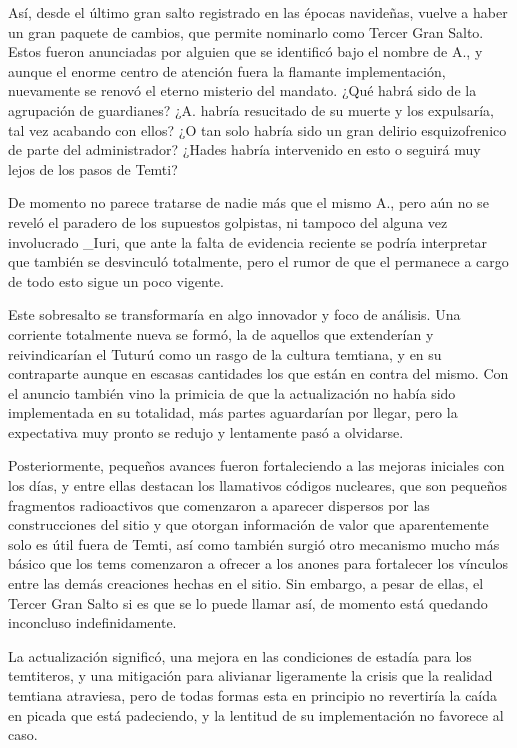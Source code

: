 \documentclass[
]{book}
\begin{document}
Así, desde el último gran salto registrado en las épocas navideñas, vuelve a haber un gran paquete de cambios, que permite nominarlo como Tercer Gran Salto. Estos fueron anunciadas por alguien que se identificó bajo el nombre de A., y aunque el enorme centro de atención fuera la flamante implementación, nuevamente se renovó el eterno misterio del mandato. ¿Qué habrá sido de la agrupación de guardianes? ¿A. habría resucitado de su muerte y los expulsaría, tal vez acabando con ellos? ¿O tan solo habría sido un gran delirio esquizofrenico de parte del administrador? ¿Hades habría intervenido en esto o seguirá muy lejos de los pasos de Temti?

De momento no parece tratarse de nadie más que el mismo A., pero aún no se reveló el paradero de los supuestos golpistas, ni tampoco del alguna vez involucrado \_Iuri, que ante la falta de evidencia reciente se podría interpretar que también se desvinculó totalmente, pero el rumor de que el permanece a cargo de todo esto sigue un poco vigente.

Este sobresalto se transformaría en algo innovador y foco de análisis. Una corriente totalmente nueva se formó, la de aquellos que extenderían y reivindicarían el Tuturú como un rasgo de la cultura temtiana, y en su contraparte aunque en escasas cantidades los que están en contra del mismo. Con el anuncio también vino la primicia de que la actualización no había sido implementada en su totalidad, más partes aguardarían por llegar, pero la expectativa muy pronto se redujo y lentamente pasó a olvidarse.

Posteriormente, pequeños avances fueron fortaleciendo a las mejoras iniciales con los días, y entre ellas destacan los llamativos códigos nucleares, que son pequeños fragmentos radioactivos que comenzaron a aparecer dispersos por las construcciones del sitio y que otorgan información de valor que aparentemente solo es útil fuera de Temti, así como también surgió otro mecanismo mucho más básico que los tems comenzaron a ofrecer a los anones para fortalecer los vínculos entre las demás creaciones hechas en el sitio. Sin embargo, a pesar de ellas, el Tercer Gran Salto si es que se lo puede llamar así, de momento está quedando inconcluso indefinidamente.

La actualización significó, una mejora en las condiciones de estadía para los temtiteros, y una mitigación para alivianar ligeramente la crisis que la realidad temtiana atraviesa, pero de todas formas esta en principio no revertiría la caída en picada que está padeciendo, y la lentitud de su implementación no favorece al caso.
\end{document}
